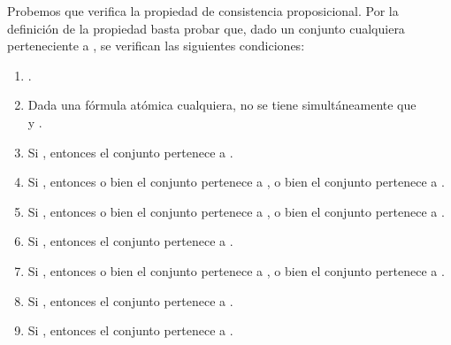 \begin{isabellebody}
\begin{isamarkuptext}
\begin{demostracion}
  Probemos que  verifica la propiedad de consistencia proposicional. Por la definición
  de la propiedad basta probar que, dado un conjunto cualquiera  perteneciente a , se
  verifican las siguientes condiciones:
  \begin{enumerate}
    \item {}.
    \item Dada  una fórmula atómica cualquiera, no se tiene 
      simultáneamente que\\  y .
    \item Si , entonces el conjunto  pertenece a .
    \item Si , entonces o bien el conjunto  pertenece a , o bien el conjunto 
       pertenece a .
    \item Si , entonces o bien el conjunto  pertenece a , o bien el 
      conjunto  pertenece a .
    \item Si , entonces el conjunto  pertenece a .
    \item Si , entonces o bien el conjunto  pertenece a , o bien el 
      conjunto  pertenece a .
    \item Si , entonces el conjunto  pertenece a .
    \item Si , entonces el conjunto  pertenece a .
  \end{enumerate}


\end{demostracion}
\end{isamarkuptext}
\end{isabellebody}
